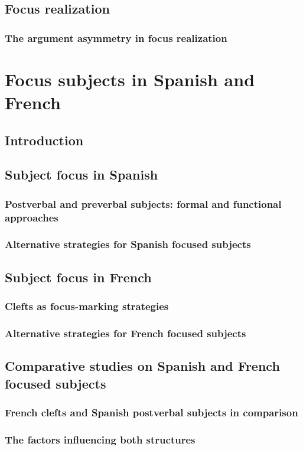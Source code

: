 \documentclass[12pt]{report}
\begin{document}
\section{Focus realization}
\subsection{The argument asymmetry in focus realization}
\chapter{Focus subjects in Spanish and French}
\section{Introduction}
\section{Subject focus in Spanish}
\subsection{Postverbal and preverbal subjects: formal and functional approaches}
\subsection{Alternative strategies for Spanish focused subjects}
\section{Subject focus in French}
\subsection{Clefts as focus-marking strategies}
\subsection{Alternative strategies for French focused subjects}
\section{Comparative studies on Spanish and French focused subjects}
\subsection{French clefts and Spanish postverbal subjects in comparison}
\subsection{The factors influencing both structures}
\end{document}
